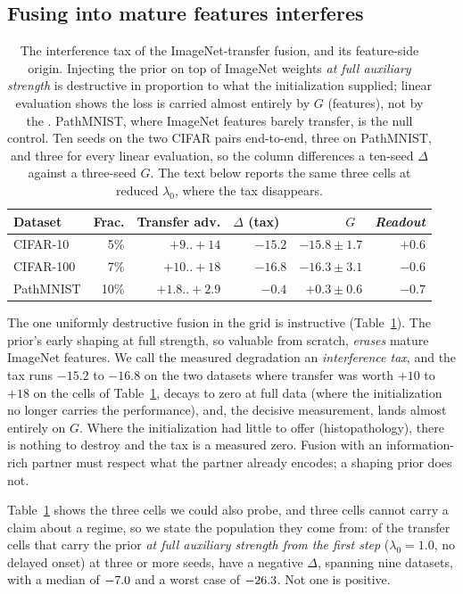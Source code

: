 \subsection{Fusing into mature features interferes}\label{sec:taxsub}
\begin{table}[pos=htbp]
\caption{The interference tax of the ImageNet-transfer fusion, and its
feature-side origin. Injecting the
prior on top of ImageNet weights \emph{at full auxiliary strength} is
destructive in proportion to what the initialization supplied; linear
evaluation shows the loss is carried almost entirely by $G$ (features), not by
the \readout. PathMNIST, where ImageNet features barely transfer, is the null
control. Ten seeds on the two CIFAR pairs end-to-end, three on PathMNIST, and
three for every linear evaluation, so the \readout{} column differences a
ten-seed $\Delta$ against a three-seed $G$. The text below reports the same
three cells at reduced $\lambda_0$, where the tax disappears.}
\label{tab:tax}
\centering\scriptsize
\setlength{\tabcolsep}{2.6pt}
\begin{tabular}{lrrrrr}
\toprule
Dataset & Frac. & Transfer adv. & $\Delta$ (tax)~\up & $G$~\up & \textit{Readout} \\
\midrule
CIFAR-10 & 5\% & $+9..{+}14$ & $-15.2$ & $-15.8 \pm 1.7$ & $+0.6$ \\
CIFAR-100 & 7\% & $+10..{+}18$ & $-16.8$ & $-16.3 \pm 3.1$ & $-0.6$ \\
PathMNIST & 10\% & $+1.8..{+}2.9$ & $-0.4$ & $+0.3 \pm 0.6$ & $-0.7$ \\
\bottomrule
\end{tabular}
\end{table}

The one uniformly destructive fusion in the grid is instructive
(Table~\ref{tab:tax}). The prior's early shaping at full strength, so valuable
from scratch, \emph{erases} mature ImageNet features. We call the measured
degradation an \emph{interference tax}, and the tax runs $-15.2$ to
$-16.8$ on the two datasets where
transfer was worth $+10$ to $+18$ on the cells of Table~\ref{tab:tax}, decays
to zero at full data (where the initialization no longer carries the
performance), and, the decisive measurement, lands almost entirely on $G$.
Where the initialization had little to offer (histopathology), there is nothing
to destroy and the tax is a measured zero. Fusion with an information-rich
partner must respect what the partner already encodes; a shaping prior does
not.

Table~\ref{tab:tax} shows the three cells we could also probe, and three cells
cannot carry a claim about a regime, so we state the population they come from:
of the \taxCells{} transfer cells that carry the prior \emph{at full auxiliary
strength from the first step} ($\lambda_0 = 1.0$, no delayed onset) at three or
more seeds, \taxNegative{} have a
negative $\Delta$, spanning nine datasets, with a median of $-7.0$ and a
worst case of $-26.3$. Not one is positive.


